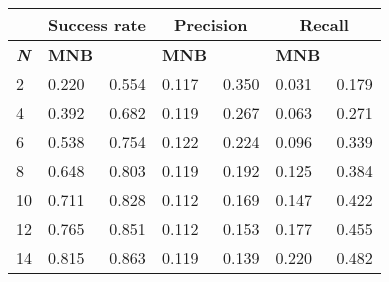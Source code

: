 \begin{table}[]
	\scriptsize
	\resizebox{8.5cm}{!} {
	\begin{tabular}{|l|l|l|l|l|l|l|}
		\hline
		\rowcolor[HTML]{C0C0C0} 
		& \multicolumn{2}{c}{\textbf{Success rate}}         & \multicolumn{2}{|c|}{\textbf{Precision}}            & \multicolumn{2}{c|}{\textbf{Recall}}               \\ \hline
	 \rowcolor[HTML]{C0C0C0} 
		\textbf{\emph{N} } & \textbf{MNB} & \textbf{\CT }& \textbf{MNB} & \textbf{\CT} & \textbf{MNB} & \textbf{\CT }\\ \hline
		2                       & 0.220               & 0.554              & 0.117               & 0.350              & 0.031               & 0.179              \\
		4                       & 0.392               & 0.682              & 0.119               & 0.267              & 0.063               & 0.271              \\
		6                       & 0.538               & 0.754              & 0.122               & 0.224              & 0.096               & 0.339              \\
		8                       & 0.648               & 0.803              & 0.119               & 0.192              & 0.125               & 0.384              \\
		10                      & 0.711               & 0.828              & 0.112               & 0.169              & 0.147               & 0.422              \\
		12                      & 0.765               & 0.851              & 0.112               & 0.153              & 0.177               & 0.455              \\
		14                      & 0.815               & 0.863              & 0.119               & 0.139              & 0.220               & 0.482              \\

\end{tabular}}
\end{table}
